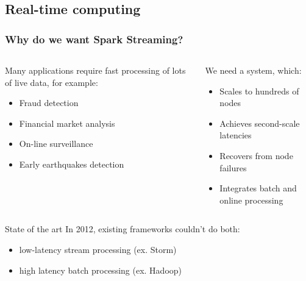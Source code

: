 \documentclass{beamer}
\begin{document}
\subsection*{Real-time computing}
\begin{frame}
\frametitle{Why do we want Spark Streaming?}

\begin{columns}
\begin{column}{0.49\textwidth}
Many applications require fast processing of lots of live data, for example:
\begin{itemize}
	\item Fraud detection
	\item Financial market analysis
	\item On-line surveillance
	\item Early earthquakes detection
\end{itemize}
\end{column}
\begin{column}{0.49\textwidth}
We need a system, which:
\begin{itemize}
	\item Scales to hundreds of nodes
	\item Achieves second-scale latencies
	\item Recovers from node failures
	\item Integrates batch and online processing
\end{itemize}
\end{column}
\end{columns}
\pause
\begin{block}{State of the art}
In 2012, existing frameworks couldn't do both:
\begin{itemize}
	\item low-latency stream processing (ex. Storm)
	\item high latency batch processing (ex. Hadoop)
\end{itemize}
\end{block}

\end{frame}
\end{document}
